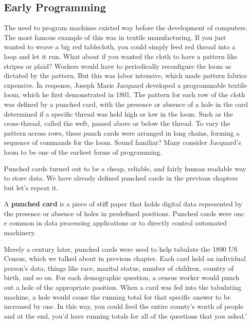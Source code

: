 \subsection{Early Programming}

The need to program machines existed way before the development of computers. The most famous example of this was in
textile manufacturing. If you just wanted to weave a big red tablecloth, you could simply feed red thread into a loop
and let it run. What about if you wanted the cloth to have a pattern like stripes or plaid? Workers would have to
periodically reconfigure the loom as dictated by the pattern. But this was labor intensive, which made pattern
fabrics expensive. \v

In response, Joseph Marie Jacquard developed a programmable textile loom, which he first demonstrated in 1801. The
pattern for each row of the cloth was defined by a punched card, with the presence or absence of a hole in the card
determined if a specific thread was held high or low in the loom. Such as the cross-thread, called the weft, passed
above or below the thread. To vary the pattern across rows, these punch cards were arranged in long chains, forming a
sequence of commands for the loom. Sound familiar? Many consider Jacquard's loom to be one of the earliest forms of
programming.


Punched cards turned out to be a cheap, reliable, and fairly human readable way to store data. We have already
defined punched cards in the previous chapters but let's repeat it.

A \textbf{punched card} is a piece of stiff paper that holds digital data represented by the presence or absence of
holes in predefined positions. Punched cards were onc e common in data processing applications or to directly control
automated machinery.
\ed


Merely a century later, punched cards were used to help tabulate the 1890 US Census, which we talked about in
previous chapter. Each card held an individual person's data, things like race, marital status, number of children,
country of birth, and so on. For each demographic question, a census worker would punch out a hole of the appropriate
position. When a card was fed into the tabulating machine, a hole would cause the running total for that specific
answer to be increased by one. In this way, you could feed the entire county's worth of people and at the end, you'd
have running totals for all of the questions that you asked. \v

